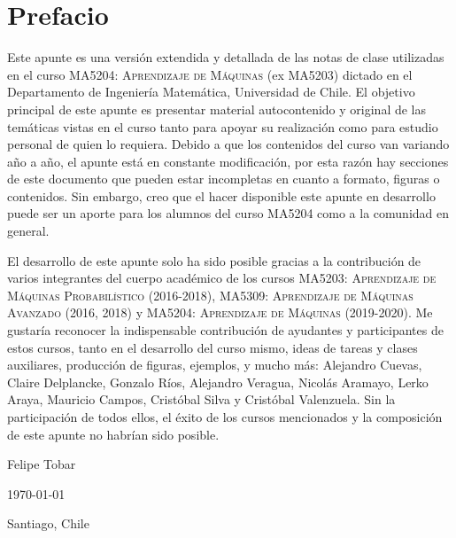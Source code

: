 \newpage
\section*{Prefacio}
Este apunte es una versión extendida y detallada de las notas de clase utilizadas en el curso \textsc{MA5204: Aprendizaje de Máquinas} (ex MA5203) dictado en el Departamento de Ingeniería Matemática, Universidad de Chile. El objetivo principal de este apunte es presentar material autocontenido y original de las temáticas vistas en el curso tanto para apoyar su realización como para estudio personal de quien lo requiera. Debido a que los contenidos del curso van variando año a año, el apunte está en constante modificación, por esta razón hay secciones de este documento que pueden estar incompletas en cuanto a formato, figuras o contenidos. Sin embargo, creo que el hacer disponible este apunte en desarrollo puede ser  un aporte para los alumnos del curso MA5204 como a la comunidad en general.

El desarrollo de este apunte solo ha sido posible gracias a la contribución de varios integrantes del cuerpo académico de los cursos \textsc{MA5203: Aprendizaje de Máquinas Probabilístico} (2016-2018), \textsc{MA5309: Aprendizaje de Máquinas Avanzado} (2016, 2018) y \textsc{MA5204: Aprendizaje de Máquinas} (2019-2020). Me gustaría reconocer la indispensable contribución de ayudantes y participantes de estos cursos, tanto en el desarrollo del curso mismo, ideas de tareas y clases auxiliares, producción de figuras, ejemplos, y mucho más: Alejandro Cuevas, Claire Delplancke, Gonzalo Ríos, Alejandro Veragua, Nicolás Aramayo, Lerko Araya, Mauricio Campos, Cristóbal Silva y Cristóbal Valenzuela. Sin la participación de todos ellos, el éxito de los cursos mencionados y la composición de este apunte no habrían sido posible.


\bigskip
\begin{flushright}
  Felipe Tobar\par
  \today\par
  Santiago, Chile
\end{flushright}
\newpage

